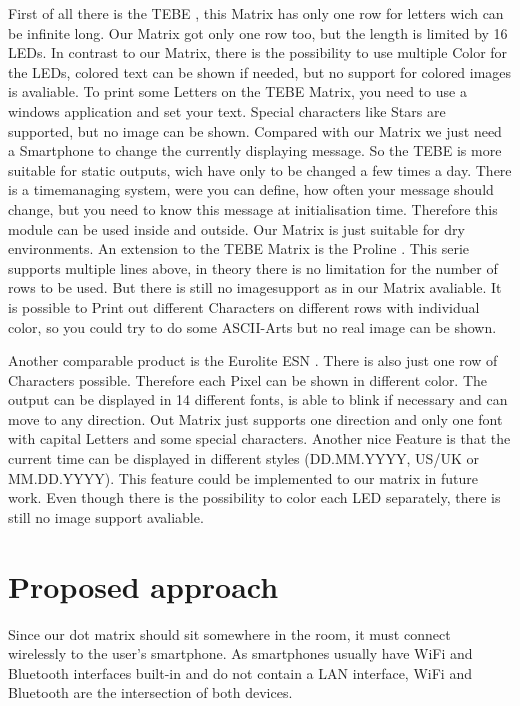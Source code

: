\documentclass[conference]{IEEEtran}
\begin{document}
First of all there is the TEBE \cite{ledtebe}, this Matrix has only one row for letters wich can be infinite long. Our Matrix got only one row too, but the length is limited by 16 LEDs. In contrast to our Matrix, there is the possibility to use multiple Color for the LEDs, colored text can be shown if needed, but no support for colored images is avaliable. To print some Letters on the TEBE Matrix, you need to use a windows application and set your text. Special characters like Stars are supported, but no image can be shown. Compared with our Matrix we just need a Smartphone to change the currently displaying message. So the TEBE is more suitable for static outputs, wich have only to be changed a few times a day. There is a timemanaging system, were you can define, how often your message should change, but you need to know this message at initialisation time. Therefore this module can be used inside and outside. Our Matrix is just suitable for dry environments. An extension to the TEBE Matrix is the Proline \cite{ledproline}. This serie supports multiple lines above, in theory there is no limitation for the number of rows to be used. But there is still no imagesupport as in our Matrix avaliable. It is possible to Print out different Characters on different rows with individual color, so you could try to do some ASCII-Arts but no real image can be shown.

Another comparable product is the Eurolite ESN \cite{esn}. There is also just one row of Characters possible. Therefore each Pixel can be shown in different color. The output can be displayed in 14 different fonts, is able to blink if necessary and can move to any direction. Out Matrix just supports one direction and only one font with capital Letters and some special characters. Another nice Feature is that the current time can be displayed in different styles (DD.MM.YYYY, US/UK or MM.DD.YYYY). This feature could be implemented to our matrix in future work. Even though there is the possibility to color each LED separately, there is still no image support avaliable.


\section{Proposed approach}
Since our dot matrix should sit somewhere in the room, it must connect wirelessly to the user's smartphone. As smartphones usually have WiFi and Bluetooth interfaces built-in and do not contain a LAN interface, WiFi and Bluetooth are the intersection of both devices.
\end{document}
